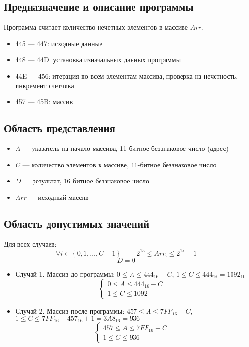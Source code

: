 \subsection{Предназначение и описание программы}
Программа считает количество нечетных элементов в массиве $Arr$.
\begin{itemize}
    \item 445 --- 447: исходные данные
    \item 448 --- 44D: установка изначальных данных программы
    \item 44E --- 456: итерация по всем элементам массива, проверка на нечетность, инкремент счетчика
    \item 457 --- 45B: массив
\end{itemize}

\subsection{Область представления}
\begin{itemize}
    \item $A$ --- указатель на начало массива, 11-битное беззнаковое число (адрес) %
    \item $C$ --- количество элементов в массиве, 11-битное беззнаковое число
    \item $D$ --- результат, 16-битное беззнаковое число
    \item $Arr$ --- исходный массив
\end{itemize}

\subsection{Область допустимых значений}
Для всех случаев:
\[ \forall i \in \left\{0, 1, \ldots, C-1  \right\} \quad -2^{15} \leq Arr_i \leq 2^{15} - 1 \]
\[ D = 0 \]
\begin{itemize}

    \item Случай 1. Массив до программы:
    $0 \leq A \leq 444_{16} - C$, $1 \leq C \leq 444_{16} = 1092_{10}$
    \[ \begin{cases}
        0 \leq A \leq 444_{16} - C \\
        1 \leq C \leq 1092
    \end{cases} \]

    \item Случай 2. Массив после программы:
    $457 \leq A \leq 7FF_{16} - C$, $1 \leq C \leq 7FF_{16} - 457_{16} + 1 = 3A8_{16} = 936$
    \[ \begin{cases}
        457 \leq A \leq 7FF_{16} - C \\
        1 \leq C \leq 936
    \end{cases} \]
\end{itemize}


